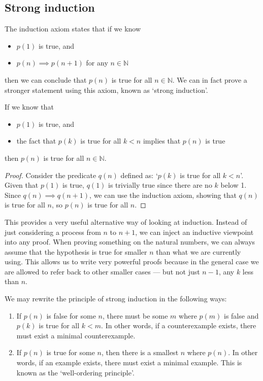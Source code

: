 \subsection{Strong induction}
The induction axiom states that if we know
\begin{itemize}
	\item \(p(1)\) is true, and
	\item \(p(n) \implies p(n+1)\) for any \(n \in \mathbb N\)
\end{itemize}
then we can conclude that \(p(n)\) is true for all \(n \in \mathbb N\).
We can in fact prove a stronger statement using this axiom, known as `strong induction'.
\begin{claim}
	If we know that
	\begin{itemize}
		\item \(p(1)\) is true, and
		\item the fact that \(p(k)\) is true for all \(k < n\) implies that \(p(n)\) is true
	\end{itemize}
	then \(p(n)\) is true for all \(n \in \mathbb N\).
\end{claim}
\begin{proof}
	Consider the predicate \(q(n)\) defined as: `\(p(k)\) is true for all \(k < n\)'.
	Given that \(p(1)\) is true, \(q(1)\) is trivially true since there are no \(k\) below 1.
	Since \(q(n) \implies q(n+1)\), we can use the induction axiom, showing that \(q(n)\) is true for all \(n\), so \(p(n)\) is true for all \(n\).
\end{proof}
This provides a very useful alternative way of looking at induction.
Instead of just considering a process from \(n\) to \(n+1\), we can inject an inductive viewpoint into any proof.
When proving something on the natural numbers, we can always assume that the hypothesis is true for smaller \(n\) than what we are currently using.
This allows us to write very powerful proofs because in the general case we are allowed to refer back to other smaller cases --- but not just \(n-1\), any \(k\) less than \(n\).

We may rewrite the principle of strong induction in the following ways:
\begin{enumerate}
	\item If \(p(n)\) is false for some \(n\), there must be some \(m\) where \(p(m)\) is false and \(p(k)\) is true for all \(k<m\).
	      In other words, if a counterexample exists, there must exist a minimal counterexample.
	\item If \(p(n)\) is true for some \(n\), then there is a smallest \(n\) where \(p(n)\).
	      In other words, if an example exists, there must exist a minimal example.
	      This is known as the `well-ordering principle'.
\end{enumerate}

